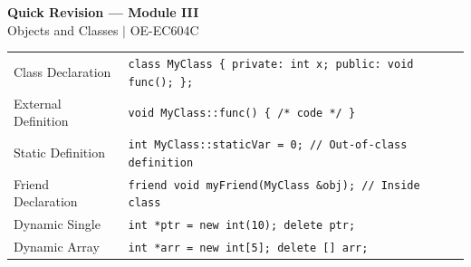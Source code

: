 \documentclass[12pt,a4paper]{article}
\renewcommand{\arraystretch}{1.45}
\begin{document}
\newpage
\begin{center}
  {\large\bfseries\color{myred} Quick Revision --- Module III}\\[3pt]
  {\small\color{mydark} Objects and Classes $|$ OE-EC604C}
\end{center}
\noindent{\color{myred}\rule{\linewidth}{1.2pt}}
\vspace{4pt}

\begin{tcolorbox}[formulabox, title={\textbf{Key Syntax and Configurations}}]
\renewcommand{\arraystretch}{1.3}
\begin{tabularx}{\linewidth}{B{3.8cm} X}
Class Declaration        & \texttt{class MyClass \{ private: int x; public: void func(); \};} \\[4pt]
External Definition      & \texttt{void MyClass::func() \{ /* code */ \}} \\[4pt]
Static Definition        & \texttt{int MyClass::staticVar = 0; // Out-of-class definition} \\[4pt]
Friend Declaration       & \texttt{friend void myFriend(MyClass \&obj); // Inside class} \\[4pt]
Dynamic Single           & \texttt{int *ptr = new int(10); \quad delete ptr;} \\[4pt]
Dynamic Array            & \texttt{int *arr = new int[5]; \quad delete [] arr;}
\end{tabularx}
\end{tcolorbox}
\end{document}
